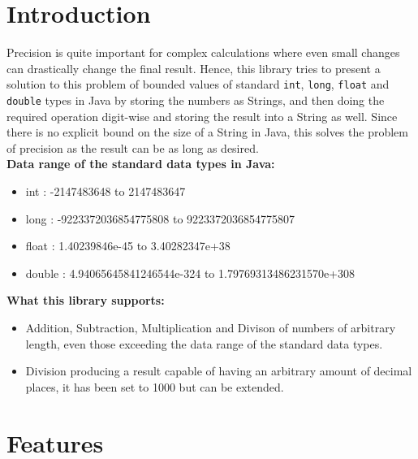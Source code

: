 \documentclass[15pt]{article}
\begin{document}
\section{Introduction}

Precision is quite important for complex calculations where even small changes can 
drastically change the final result. Hence, this library tries to present a solution 
to this problem of bounded values of standard \texttt{int}, \texttt{long}, \texttt{float} and \texttt{double} types in 
Java by storing the numbers as Strings, and then doing the required operation digit-wise 
and storing the result into a String as well. Since there is no explicit bound on the 
size of a String in Java, this solves the problem of precision as the result can be as 
long as desired.\\

\textbf{Data range of the standard data types in Java:}
\begin{itemize}
    \item  int : -2147483648 to 2147483647
    \item long : -9223372036854775808 to 9223372036854775807
    \item float : 1.40239846e-45 to 3.40282347e+38
    \item double : 4.94065645841246544e-324 to 1.79769313486231570e+308
\end{itemize}

\textbf{What this library supports:}
\begin{itemize}
    \item Addition, Subtraction, Multiplication and Divison of numbers of arbitrary length, even those exceeding the data range of the standard data types.
    \item Division producing a result capable of having an arbitrary amount of decimal places, it has been set to 1000 but can be extended.
\end{itemize}

\newpage

\section{Features}
\end{document}
